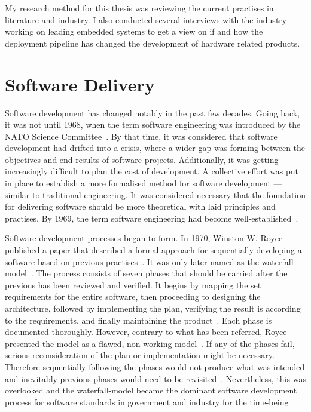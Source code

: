 \documentclass[english]{tktltiki2}
\begin{document}
My research method for this thesis was reviewing the current practises in literature and industry. I also conducted several interviews with the industry working on leading embedded systems to get a view on if and how the deployment pipeline has changed the development of hardware related products.


\section{Software Delivery}

Software development has changed notably in the past few decades. Going back, it was not until 1968, when the term software engineering was introduced by the NATO Science Committee~\cite{NR69}. By that time, it was considered that software development had drifted into a crisis, where a wider gap was forming between the objectives and end-results of software projects. Additionally, it was getting increasingly difficult to plan the cost of development. A collective effort was put in place to establish a more formalised method for software development — similar to traditional engineering. It was considered necessary that the foundation for delivering software should be more theoretical with laid principles and practises. By 1969, the term software engineering had become well-established~\cite{BR70}.

Software development processes began to form. In 1970, Winston W. Royce published a paper that described a formal approach for sequentially developing a software based on previous practises~\cite{Roy70}. It was only later named as the waterfall-model~\cite{Boe88, LB03}. The process consists of seven phases that should be carried after the previous has been reviewed and verified. It begins by mapping the set requirements for the entire software, then proceeding to designing the architecture, followed by implementing the plan, verifying the result is according to the requirements, and finally maintaining the product~\cite{Roy70}. Each phase is documented thoroughly. However, contrary to what has been referred, Royce presented the model as a flawed, non-working model~\cite{Roy70}. If any of the phases fail, serious reconsideration of the plan or implementation might be necessary. Therefore sequentially following the phases would not produce what was intended and inevitably previous phases would need to be revisited~\cite{Roy70}. Nevertheless, this was overlooked and the waterfall-model became the dominant software development process for software standards in government and industry for the time-being~\cite{Boe88, LB03}.
\end{document}
